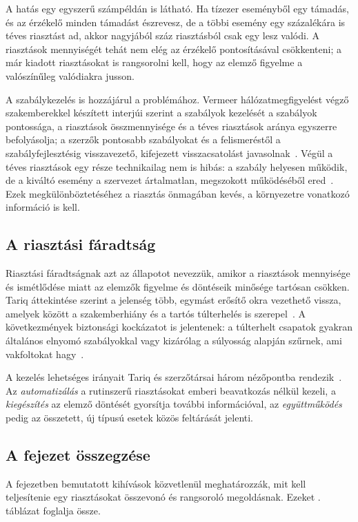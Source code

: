A hatás egy egyszerű számpéldán is látható. Ha tízezer eseményből egy támadás, és az érzékelő minden támadást észrevesz, de a többi esemény egy százalékára is téves riasztást ad, akkor nagyjából száz riasztásból csak egy lesz valódi. A riasztások mennyiségét tehát nem elég az érzékelő pontosításával csökkenteni; a már kiadott riasztásokat is rangsorolni kell, hogy az elemző figyelme a valószínűleg valódiakra jusson.

A szabálykezelés is hozzájárul a problémához. Vermeer hálózatmegfigyelést végző szakemberekkel készített interjúi szerint a szabályok kezelését a szabályok pontossága, a riasztások összmennyisége és a téves riasztások aránya egyszerre befolyásolja; a szerzők pontosabb szabályokat és a felismeréstől a szabályfejlesztésig visszavezető, kifejezett visszacsatolást javasolnak~\cite{vermeer2023}. Végül a téves riasztások egy része technikailag nem is hibás: a szabály helyesen működik, de a kiváltó esemény a szervezet ártalmatlan, megszokott működéséből ered~\cite{alahmadi2022}. Ezek megkülönböztetéséhez a riasztás önmagában kevés, a környezetre vonatkozó információ is kell.

\subsection{A riasztási fáradtság}\label{sec:faradtsag}
Riasztási fáradtságnak azt az állapotot nevezzük, amikor a riasztások mennyisége és ismétlődése miatt az elemzők figyelme és döntéseik minősége tartósan csökken. Tariq áttekintése szerint a jelenség több, egymást erősítő okra vezethető vissza, amelyek között a szakemberhiány és a tartós túlterhelés is szerepel~\cite{tariq2025}. A következmények biztonsági kockázatot is jelentenek: a túlterhelt csapatok gyakran általános elnyomó szabályokkal vagy kizárólag a súlyosság alapján szűrnek, ami vakfoltokat hagy~\cite{ndichu2026}.

A kezelés lehetséges irányait Tariq és szerzőtársai három nézőpontba rendezik~\cite{tariq2025}. Az \emph{automatizálás} a rutinszerű riasztásokat emberi beavatkozás nélkül kezeli, a \emph{kiegészítés} az elemző döntését gyorsítja további információval, az \emph{együttműködés} pedig az összetett, új típusú esetek közös feltárását jelenti.

\subsection{A fejezet összegzése}\label{sec:ids-soc-osszegzes}
A fejezetben bemutatott kihívások közvetlenül meghatározzák, mit kell teljesítenie egy riasztásokat összevonó és rangsoroló megoldásnak. Ezeket \az{\ref{tab:kihivasok}}. táblázat foglalja össze.

